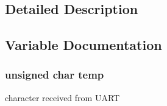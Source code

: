 \subsection{Detailed Description}


\subsection{Variable Documentation}
\subsubsection[{\texorpdfstring{temp}{temp}}]{\setlength{\rightskip}{0pt plus 5cm}unsigned char temp\hspace{0.3cm}{\ttfamily [static]}}\hypertarget{group___debug___private___variables_gabe413cb96d839cbe31417aa52d920f21}{}\label{group___debug___private___variables_gabe413cb96d839cbe31417aa52d920f21}
character received from U\+A\+RT 